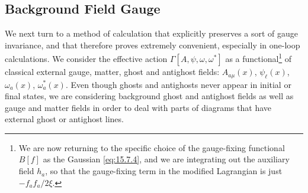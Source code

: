 \subsection{Background Field Gauge}

We next turn to a method of calculation that explicitly preserves a sort of
gauge invariance, and that therefore proves extremely convenient, especially
in one-loop calculations. We consider the effective action
$\Gamma[A,\psi,\omega,\omega^*]$ as a functional\footnote{We are now returning to the specific choice of the gauge-fixing functional $B[f]$ as the Gaussian \eqref{eq:15.7.4}, and we are integrating out the auxiliary field $h_a$, so that the gauge-fixing term in the modified Lagrangian is just $-f_a f_a/2\xi$.}
of classical external gauge, matter, ghost and antighost fields:
$A_{a\mu}(x)$, $\psi_\ell(x)$, $\omega_a(x)$,
$\omega_a^*(x)$. Even though ghosts and antighosts never appear in
initial or final states, we are considering background ghost and antighost
fields as well as gauge and matter fields in order to deal with parts of
diagrams that have external ghost or antighost lines.

